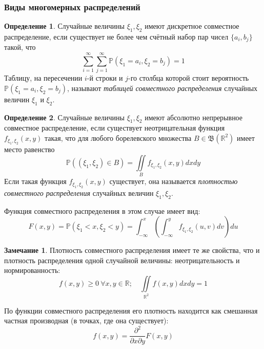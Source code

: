 \documentclass[oneside,final,14pt]{extreport}
\theoremstyle{plain}
\theoremstyle{definition}
\newtheorem*{defn}{Определение}
\newtheorem*{rmrk}{Замечание}
\theoremstyle{named}
\begin{document}
\subsubsection{Виды многомерных распределений}

\begin{defn}
    Случайные величины $\xi_1, \xi_2$ имеют дискретное совместное распределение, если существует не более чем счётный набор пар чисел $\{a_{i}, b_{j}\}$ такой, что
    \begin{equation*}
        \sum\limits_{i=1}^{\infty} \sum\limits_{j=1}^{\infty} \mathbb{P}\left(\xi_{1}=a_{i}, \xi_{2}=b_{j}\right)=1
    \end{equation*}
    Таблицу, на пересечении $i$-й строки и $j$-го столбца которой стоит вероятность $\mathbb{P}\left(\xi_{1}=a_{i}, \xi_{2}=b_{j}\right)$, называют {\it таблицей совместного распределения} случайных величин $\xi_1$ и $\xi_2$.
\end{defn}
\begin{defn}
    Случайные величины $\xi_1, \xi_2$ имеют абсолютно непрерывное совместное распределение, если существует неотрицательная функция $f_{\xi_{1}, \xi_{2}}(x, y)$ такая, что для любого борелевского множества $B \in \mathfrak{B}\left(\mathbb{R}^{2}\right)$ имеет место равенство
    \begin{equation*}
        \mathbb{P}\left(\left(\xi_{1}, \xi_{2}\right) \in B\right)=\iint\limits_{B} f_{\xi_{1}, \xi_{2}}(x, y) d x d y
    \end{equation*}
    Если такая функция $f_{\xi_{1}, \xi_{2}}(x, y)$ существует, она называется {\it плотностью совместного распределения} случайных величин $\xi_1, \xi_2$.
    
    Функция совместного распределения в этом случае имеет вид:
    \begin{equation*}
        F(x, y)=\mathbb{P}(\xi_{1}<x, \xi_{2}<y)=\int_{-\infty}^{x}\left(\int_{-\infty}^{y} f_{\xi_{1}, \xi_{2}}(u, v) d v\right) d u
    \end{equation*}
\end{defn}

\begin{rmrk}
    Плотность совместного распределения имеет те же свойства, что и плотность распределения одной случайной величины: неотрицательность и нормированность:
    \begin{equation*}
        f(x, y) \geqslant 0~ \forall x,y \in \mathbb{R}; \quad \iint\limits_{\mathbb{R}^{2}} f(x, y) dx dy = 1
    \end{equation*}

    По функции совместного распределения его плотность находится как смешанная частная производная (в точках, где она существует):
    \begin{equation*}
        f(x, y)=\frac{\partial^{2}}{\partial x \partial y} F(x, y)
    \end{equation*}
\end{rmrk}
\end{document}
